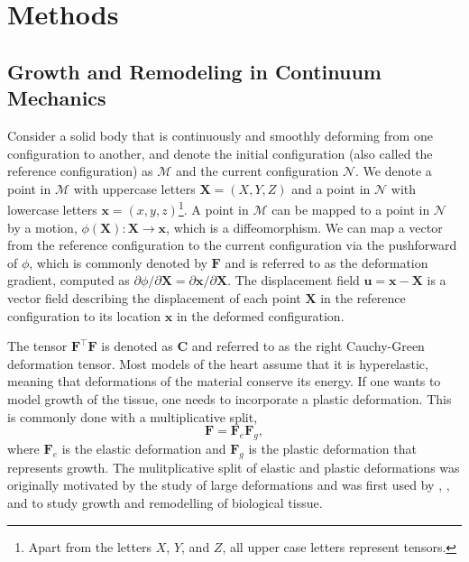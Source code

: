 \section{Methods}
\subsection{Growth and Remodeling in Continuum Mechanics}
Consider a solid body that is continuously and smoothly deforming from one configuration to another, and denote the initial configuration (also called the reference configuration) as $\mathcal{M}$ and the current configuration $\mathcal{N}$. We denote a point in $\mathcal{M}$ with uppercase letters $\mathbf{X} = (X, Y, Z)$ and a point in $\mathcal{N}$ with lowercase letters $\mathbf{x} = (x, y, z)$\footnote{Apart from the letters $X$, $Y$, and $Z$, all upper case letters represent tensors.}. A point in $\mathcal{M}$ can be mapped to a point in $\mathcal{N}$ by a motion, $\phi(\mathbf{X}): \mathbf{X} \rightarrow \mathbf{x}$, which is a diffeomorphism. We can map a vector from the reference configuration to the current configuration via the pushforward of $\phi$, which is commonly denoted by $\mathbf{F}$ and is referred to as the deformation gradient, computed as $\partial\phi/\partial\mathbf{X} = \partial\mathbf{x}/\partial\mathbf{X}$. The displacement field $\mathbf{u} = \mathbf{x} - \mathbf{X}$ is a vector field describing the displacement of each point $\mathbf{X}$ in the reference configuration to its location $\mathbf{x}$ in the deformed configuration. \par 
The tensor $\mathbf{F}^\top\mathbf{F}$ is denoted as $\mathbf{C}$ and referred to as the right Cauchy-Green deformation tensor. Most models of the heart assume that it is hyperelastic, meaning that deformations of the material conserve its energy. If one wants to model growth of the tissue, one needs to incorporate a plastic deformation. This is commonly done with a multiplicative split, 
\begin{equation}
\label{eq: multiplicative split}
    \mathbf{F} = \mathbf{F}_e\mathbf{F}_g,
\end{equation}
where $\mathbf{F}_e$ is the elastic deformation and $\mathbf{F}_g$ is the plastic deformation that represents growth. The mulitplicative split of elastic and plastic deformations was originally motivated by the study of large deformations and was first used by \citep{Kondaurov1987}, \citep{Takamizawa1990}, and \citep{Rodriguez1994} to study growth and remodelling of biological tissue. \par 
